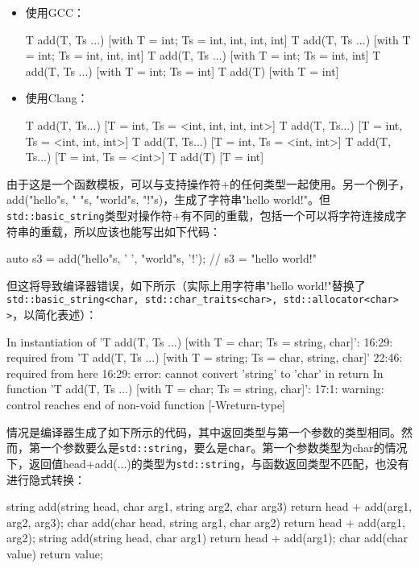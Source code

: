\begin{itemize}
\item
使用GCC：

\begin{shell}
T add(T, Ts ...) [with T = int; Ts = {int, int, int, int}]
T add(T, Ts ...) [with T = int; Ts = {int, int, int}]
T add(T, Ts ...) [with T = int; Ts = {int, int}]
T add(T, Ts ...) [with T = int; Ts = {int}]
T add(T) [with T = int]
\end{shell}

\item
使用Clang：

\begin{shell}
T add(T, Ts...) [T = int, Ts = <int, int, int, int>]
T add(T, Ts...) [T = int, Ts = <int, int, int>]
T add(T, Ts...) [T = int, Ts = <int, int>]
T add(T, Ts...) [T = int, Ts = <int>]
T add(T) [T = int]
\end{shell}
\end{itemize}

由于这是一个函数模板，可以与支持操作符+的任何类型一起使用。另一个例子，add("hello"s, " "s, "world"s, "!"s)，生成了字符串"hello world!"。但\verb|std::basic_string|类型对操作符+有不同的重载，包括一个可以将字符连接成字符串的重载，所以应该也能写出如下代码：

\begin{cpp}
auto s3 = add("hello"s, ' ', "world"s, '!'); // s3 = "hello world!"
\end{cpp}

但这将导致编译器错误，如下所示（实际上用字符串"hello world!"替换了\verb|std::basic_string<char, std::char_traits<char>, std::allocator<char> >|，以简化表述）：

\begin{shell}
In instantiation of 'T add(T, Ts ...) [with T = char; Ts = {string, char}]':
16:29:   required from 'T add(T, Ts ...) [with T = string; Ts = {char, string, char}]'
22:46:   required from here
16:29: error: cannot convert 'string' to 'char' in return
In function 'T add(T, Ts ...) [with T = char; Ts = {string, char}]':
17:1: warning: control reaches end of non-void function [-Wreturn-type]
\end{shell}

情况是编译器生成了如下所示的代码，其中返回类型与第一个参数的类型相同。然而，第一个参数要么是\verb|std::string|，要么是\verb|char|。第一个参数类型为char的情况下，返回值head+add(...)的类型为\verb|std::string|，与函数返回类型不匹配，也没有进行隐式转换：

\begin{cpp}
string add(string head, char arg1, string arg2, char arg3)
{return head + add(arg1, arg2, arg3);}
char add(char head, string arg1, char arg2)
{return head + add(arg1, arg2);}
string add(string head, char arg1)
{return head + add(arg1);}
char add(char value)
{return value;}
\end{cpp}

